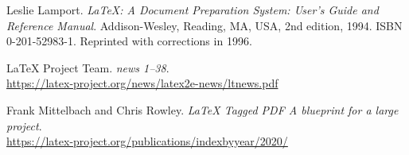 \documentclass{ltnews}
\providecommand\Dash {\unskip \textemdash}
\providecommand\tubcommand[1]{}
\begin{document}
\medskip
\tubcommand{\newpage}

\begin{thebibliography}{9}



Leslie Lamport.
\newblock \emph{{\LaTeX}: {A} Document Preparation System: User's Guide and Reference
  Manual}.
\newblock \mbox{Addison}-Wesley, Reading, MA, USA, 2nd edition, 1994.
\newblock ISBN 0-201-52983-1.
\newblock Reprinted with corrections in 1996.


 \LaTeX{} Project Team.
  \emph{\LaTeXe{} news 1--38}.\\
  \url{https://latex-project.org/news/latex2e-news/ltnews.pdf}

 Frank Mittelbach and Chris Rowley.
  \emph{\LaTeX{} Tagged PDF \Dash A blueprint for a large project}.\\
  \url{https://latex-project.org/publications/indexbyyear/2020/}



\end{thebibliography}
\end{document}
